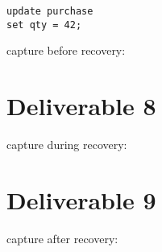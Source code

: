 \documentclass{article}
\begin{document}
\begin{verbatim}
update purchase
set qty = 42;
\end{verbatim}

capture before recovery: \\


\section{Deliverable 8}

capture during recovery: \\


\section{Deliverable 9}

capture after recovery: \\
\end{document}
